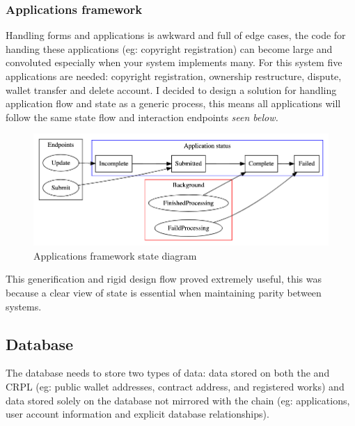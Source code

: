 \subsubsection{Applications framework}
\label{sec:application-framework-design}

Handling forms and applications is awkward and full of edge cases, the code for handing these applications (eg: copyright registration) can become large and convoluted especially when your system implements many. For this system five applications are needed: copyright registration, ownership restructure, dispute, wallet transfer and delete account. I decided to design a solution for handling application flow and state as a generic process, this means all applications will follow the same state flow and interaction endpoints \textit{seen below.} 

\begin{figure}[H]
\caption{Applications framework state diagram}
\centering
\includegraphics[width=\textwidth,height=0.5\textheight,keepaspectratio]{images/operational/applications-status}
\end{figure}

This generification and rigid design flow proved extremely useful, this was because a clear view of state is essential when maintaining parity between systems.

\subsection{Database}

The database needs to store two types of data: data stored on both the  and CRPL (eg: public wallet addresses, contract address, and registered works) and data stored solely on the database not mirrored with the chain (eg: applications, user account information and explicit database relationships).

